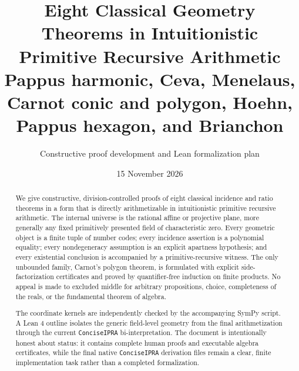\documentclass[10pt,letterpaper]{article}
\title{Eight Classical Geometry Theorems in Intuitionistic Primitive Recursive Arithmetic\\
\large Pappus harmonic, Ceva, Menelaus, Carnot conic and polygon, Hoehn, Pappus hexagon, and Brianchon}
\author{Constructive proof development and Lean formalization plan}
\date{15 November 2026}
\theoremstyle{definition}
\begin{document}
\maketitle

\begin{abstract}
We give constructive, division-controlled proofs of eight classical incidence and ratio theorems in a form that is directly arithmetizable in intuitionistic primitive recursive arithmetic.  The internal universe is the rational affine or projective plane, more generally any fixed primitively presented field of characteristic zero.  Every geometric object is a finite tuple of number codes; every incidence assertion is a polynomial equality; every nondegeneracy assumption is an explicit apartness hypothesis; and every existential conclusion is accompanied by a primitive-recursive witness.  The only unbounded family, Carnot's polygon theorem, is formulated with explicit side-factorization certificates and proved by quantifier-free induction on finite products.  No appeal is made to excluded middle for arbitrary propositions, choice, completeness of the reals, or the fundamental theorem of algebra.

The coordinate kernels are independently checked by the accompanying SymPy script.  A Lean 4 outline isolates the generic field-level geometry from the final arithmetization through the current \texttt{ConciseIPRA} bi-interpretation.  The document is intentionally honest about status: it contains complete human proofs and executable algebra certificates, while the final native \texttt{ConciseIPRA} derivation files remain a clear, finite implementation task rather than a completed formalization.
\end{abstract}

\tableofcontents
\newpage
















\end{document}
